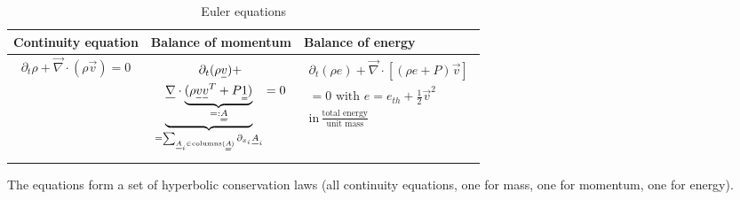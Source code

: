 \begin{table}[!htb]
    \centering
    \begin{tabular}{|p{}|p{}|p{}|}
        \hline
        \textcolor{blue1}{Continuity equation} & \textcolor{blue1}{Balance of momentum} &  \textcolor{blue1}{Balance of energy} \\
        \hline
        \begin{equation}
            \partial_t \rho + \vec{\nabla} \cdot (\rho \vec{v}) = 0
        \end{equation} &
        \begin{equation}
            \begin{gathered}
                \partial_t (\rho \vec{v}) + \\ \underbrace{\vec{\nabla} \cdot \underbrace{(\rho \vec{v}\vec{v}^T + P\mat{1})}_{=:\mat{A}}}_{=\sum_{\vec{A}_i \in \text{columns}(\mat{A})} \partial_{x_i} \vec{A}_i} = 0
            \end{gathered}
        \end{equation} &
        \begin{equation}
            \begin{gathered}
                \partial_t (\rho e) + \vec{\nabla} \cdot \left[(\rho e + P)\vec{v} \right]\\ = 0 
                \text{ with } e = e_{th} + \frac{1}{2} \vec{v}^2 \\
                \text{in} \, \frac{\text{total energy}}{\text{unit mass}}
            \end{gathered}
        \end{equation} \\
        \hline
    \end{tabular}
    \caption{Euler equations}
    \label{tab:euler_eq}
\end{table}
The equations form a set of hyperbolic conservation laws (all continuity equations, one for mass, one for momentum, one for energy).

